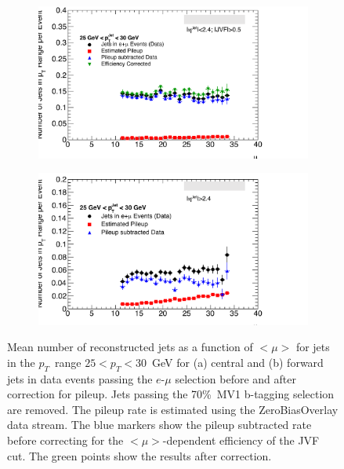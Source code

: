 \begin{figure}
\begin{subfigure}[]{0.45\textwidth}
\includegraphics[width=\textwidth]{fig/Pileup/Pileup2530.pdf}
\end{subfigure}
\begin{subfigure}[]{0.45\textwidth}
\includegraphics[width=\textwidth]{fig/Pileup/FwdPileup.pdf}
\end{subfigure}

\caption{Mean number of reconstructed jets as a function of $<\mu>$ 
for jets in the $p_T$~range $25<p_T<30$~GeV for (a) central and (b) forward jets
in data events passing the $e$-$\mu$ selection before and after correction for pileup.
Jets passing the 70\%\  MV1 b-tagging selection are removed.
The pileup rate is estimated using the ZeroBiasOverlay data stream.
The blue markers show the pileup subtracted rate before correcting
for the $<\mu>$-dependent efficiency of the JVF cut.  The green
points show the results after correction.}
\label{fig:pileupjets}
\end{figure}

